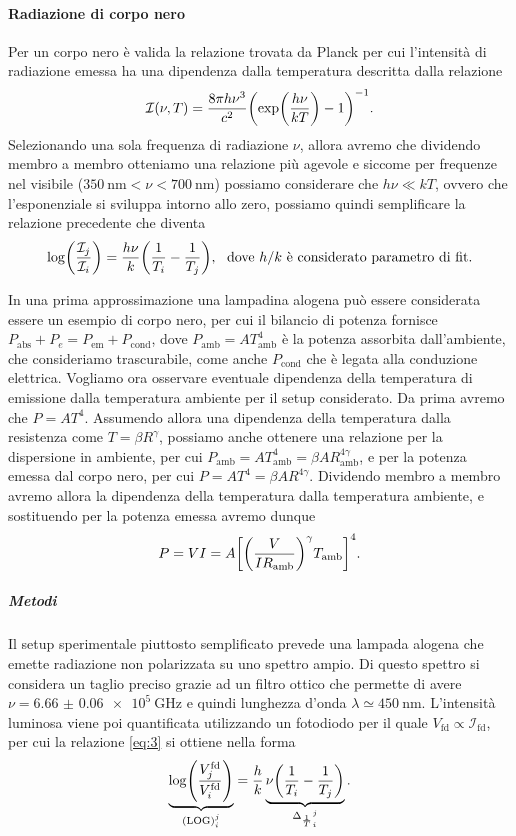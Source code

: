 \documentclass[a4paper, varvw, nofootinbib]{revtex4-2}
\begin{document}
\paragraph*{Radiazione di corpo nero} Per un corpo nero è valida la relazione trovata da Planck per cui l'intensità di radiazione emessa ha una dipendenza dalla temperatura descritta dalla relazione \begin{equation} \mathcal I(\nu, T) = \frac{8 \pi h \nu^3}{c^2}\qty(\exp(\frac{h\nu}{kT})-1)^{-1}.  \end{equation} Selezionando una sola frequenza di radiazione $\nu$, allora avremo che dividendo membro a membro otteniamo una relazione più agevole e siccome per frequenze nel visibile ($\SI{350}{\nano\metre} < \nu <\SI{700}{\nano\metre}$) possiamo considerare che $h\nu \ll kT$, ovvero che l'esponenziale si sviluppa intorno allo zero, possiamo quindi semplificare la relazione precedente che diventa \begin{equation} \log(\frac{\mathcal I_j}{\mathcal I_i}) = \frac{h\nu}{k}\qty({1\over T_i} - {1\over T_j}),~\text{ dove $h/k$ è considerato parametro di fit.} \label{eq:3}\end{equation}

In una prima approssimazione una lampadina alogena può essere considerata essere un esempio di corpo nero, per cui il bilancio di potenza fornisce $P_\text{abs} + P_e = P_\text{em} + P_\text{cond}$, dove $P_\text{amb} = AT_\text{amb}^4$ è la potenza assorbita dall'ambiente, che consideriamo trascurabile, come anche $P_\text{cond}$ che è legata alla conduzione elettrica. 
Vogliamo ora osservare eventuale dipendenza della temperatura di emissione dalla temperatura ambiente per il setup considerato. Da prima avremo che $P = AT^4$. Assumendo allora una dipendenza della temperatura dalla resistenza come $T = \beta R^\gamma$, possiamo anche ottenere una relazione per la dispersione in ambiente, per cui $P_\text{amb} = AT_\text{amb}^4 = \beta A R^{4\gamma}_\text{amb}$, e per la potenza emessa dal corpo nero, per cui $P = AT^4 = \beta A R^{4\gamma}$. Dividendo membro a membro avremo allora la dipendenza della temperatura dalla temperatura ambiente, e sostituendo per la potenza emessa avremo dunque \begin{equation} P = VI =  A \qty[\qty(\frac{V}{IR_\text{amb}})^\gamma T_\text{amb}]^4.\label{eq:4} \end{equation} 

\subparagraph*{Metodi}\label{sec:black_body_methods} Il setup sperimentale piuttosto semplificato prevede una lampada alogena che emette radiazione non polarizzata su uno spettro ampio. Di questo spettro si considera un taglio preciso grazie ad un filtro ottico che permette di avere $\nu = \SI{6.66(6)e+5}{\giga\hertz}$ e quindi lunghezza d'onda $\lambda \simeq \SI{450}{\nano\metre}$. L'intensità luminosa viene poi quantificata utilizzando un fotodiodo per il quale $V_\text{fd} \propto \mathcal I_\text{fd}$, per cui la relazione \eqref{eq:3} si ottiene nella forma \begin{equation}\underbrace{\log(\frac{V^\text{fd}_j}{V^\text{fd}_i})}_{(\text{LOG})_i^j} = \frac{h}{k}\underbrace{\nu\qty({1\over T_i} - {1\over T_j})}_{{\Delta_{\frac{1}{T}}}_i^j}. \label{eq:5}\end{equation}
\end{document}
